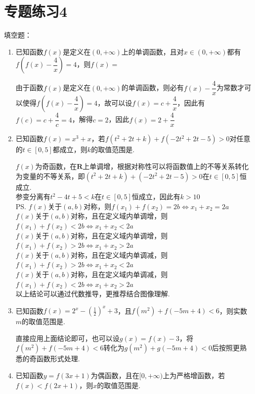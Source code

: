 \chapter*{专题练习4}
填空题：
\begin{enumerate}
    \item 已知函数$f(x)$是定义在$(0, +\infty)$上的单调函数，且对$x \in (0, +\infty)$都有$f(f(x) - \dfrac{4}{x}) = 4$，则$f(x) = $
    \begin{jieda}
        由于函数$f(x)$是定义在$(0, +\infty)$的单调函数，则必有$f(x) - \dfrac{4}{x}$为常数才可以使得$f(f(x) - \dfrac{4}{x}) = 4$，故可以设$f(x) = c + \dfrac{4}{x}$，因此有$f(c) = c + \dfrac{4}{c} = 4$，解得$c = 2$，因此$f(x) = 2+\dfrac{4}{x}$
    \end{jieda}
    \item 已知函数$f(x) = x^3+x$，若$f(t^2+2t+k)+f(-2t^2+2t-5)>0$对任意的$t \in [0, 5]$都成立，则$k$的取值范围是.
    \begin{jieda}
        $f(x)$为奇函数，在$\mathbf{R}$上单调增，根据对称性可以将函数值上的不等关系转化为变量的不等关系，即$(t^2+2t+k)+(-2t^2+2t-5)>0$在$t \in [0, 5]$恒成立.\\
        参变分离有$t^2-4t+5 < k$在$t \in [0, 5]$恒成立，因此有$k > 10$ \\
        \ps $f(x)$关于$(a, b)$对称，则$f(x_1) + f(x_2) = 2b \Leftrightarrow x_1 + x_2 = 2a$ \\
        $f(x)$关于$(a, b)$对称，且在定义域内单调增，则$f(x_1) + f(x_2) < 2b \Leftrightarrow x_1 + x_2 < 2a$ \\
        $f(x)$关于$(a, b)$对称，且在定义域内单调增，则$f(x_1) + f(x_2) > 2b \Leftrightarrow x_1 + x_2 > 2a$ \\
        $f(x)$关于$(a, b)$对称，且在定义域内单调减，则$f(x_1) + f(x_2) > 2b \Leftrightarrow x_1 + x_2 < 2a$ \\
        $f(x)$关于$(a, b)$对称，且在定义域内单调减，则$f(x_1) + f(x_2) < 2b \Leftrightarrow x_1 + x_2 > 2a$ \\
        以上结论可以通过代数推导，更推荐结合图像理解.
    \end{jieda}
    \item 已知函数$f(x) = 2^x - (\frac{1}{2})^x+3$，且$f(m^2)+f(-5m+4)<6$，则实数$m$的取值范围是.
    \begin{jieda}
        直接应用上面结论即可，也可以设$g(x) = f(x) - 3$，将$f(m^2)+f(-5m+4)<6$转化为$g(m^2)+g(-5m+4)<0$后按照更熟悉的奇函数形式处理.
    \end{jieda}
    \item 已知函数$y = f(3x+1)$为偶函数，且在$[0, +\infty)$上为严格增函数，若$f(x) < f(2x+1)$，则$x$的取值范围是.

\end{enumerate}
